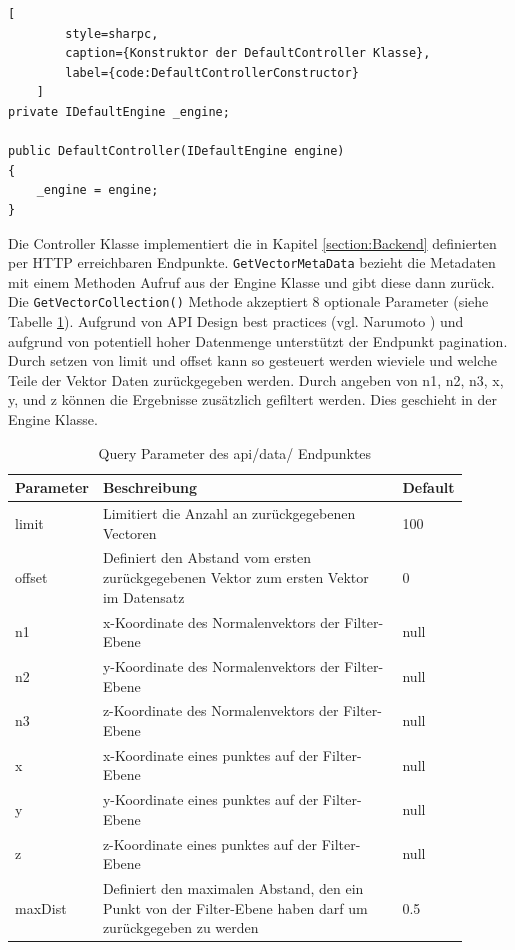 \begin{codeblock}
	\begin{lstlisting}[
		style=sharpc,
		caption={Konstruktor der DefaultController Klasse},
		label={code:DefaultControllerConstructor}
	]
private IDefaultEngine _engine;

public DefaultController(IDefaultEngine engine)
{
	_engine = engine;
}
	\end{lstlisting}
\end{codeblock}

Die Controller Klasse implementiert die in Kapitel \ref{section:Backend}
definierten per HTTP erreichbaren Endpunkte. \texttt{GetVectorMetaData} bezieht die Metadaten mit einem
Methoden Aufruf aus der Engine Klasse und gibt diese dann zurück.
Die \texttt{GetVectorCollection()} Methode akzeptiert 8 optionale Parameter
(siehe Tabelle \ref{tab:EndpointQueryParameters}). Aufgrund von API
Design best practices (vgl. Narumoto \cite{ApiDesignBestPractices})
und aufgrund von potentiell hoher Datenmenge unterstützt der Endpunkt
pagination. Durch setzen von limit und offset kann so gesteuert werden
wieviele und welche Teile der Vektor Daten zurückgegeben werden.
Durch angeben von n1, n2, n3, x, y, und z können die Ergebnisse
zusätzlich gefiltert werden. Dies geschieht in der Engine Klasse.

\begin{table}
	\centering
	\begin{tabular}[h]{p{0.11\linewidth} | p{0.7\linewidth}| p{0.09\linewidth}}
	Parameter & Beschreibung & Default \\
	\hline
	limit & Limitiert die Anzahl an zurückgegebenen Vectoren & 100\\
	offset & Definiert den Abstand vom ersten zurückgegebenen Vektor zum ersten Vektor im Datensatz & 0\\
	n1 & x-Koordinate des Normalenvektors der Filter-Ebene & null\\
	n2 & y-Koordinate des Normalenvektors der Filter-Ebene & null\\
	n3 & z-Koordinate des Normalenvektors der Filter-Ebene & null\\
	x & x-Koordinate eines punktes auf der Filter-Ebene & null\\
	y & y-Koordinate eines punktes auf der Filter-Ebene & null\\
	z & z-Koordinate eines punktes auf der Filter-Ebene & null\\
	maxDist & Definiert den maximalen Abstand, den ein Punkt von der Filter-Ebene haben darf um zurückgegeben zu werden & 0.5\\
	\end{tabular}
	\caption{Query Parameter des api/data/ Endpunktes}
	\label{tab:EndpointQueryParameters}
\end{table}

